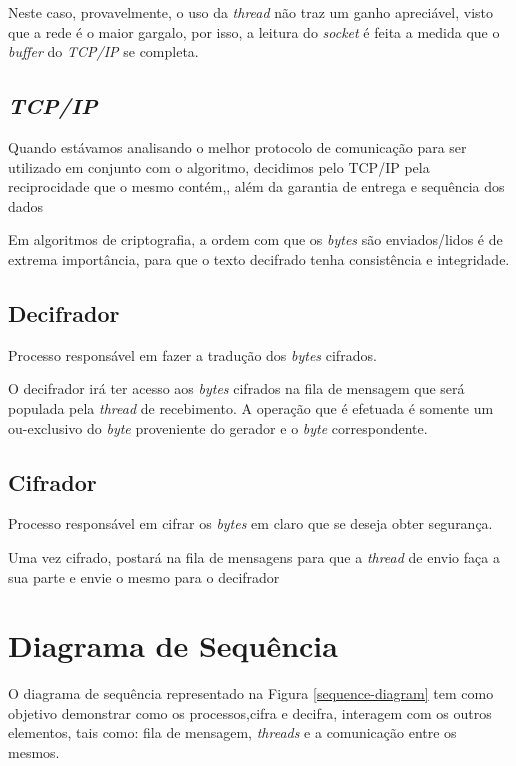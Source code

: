 Neste caso, provavelmente, o uso da \textit{thread} não traz um ganho apreciável, visto que a rede é o maior gargalo, por isso, a leitura do \textit{socket} é feita a medida que o \textit{buffer} do \textit{TCP/IP} se completa.

\subsection{\textit{TCP/IP}}

Quando estávamos analisando o melhor protocolo de comunicação para ser utilizado em conjunto com o algoritmo, decidimos pelo TCP/IP pela reciprocidade que o mesmo contém,, além da garantia de entrega e sequência dos dados 

Em algoritmos de criptografia, a ordem com que os \textit{bytes} são enviados/lidos é de extrema importância, para que o texto decifrado tenha consistência e integridade. 
\subsection{Decifrador}

Processo responsável em fazer a tradução dos \textit{bytes} cifrados. 

O decifrador irá ter acesso aos \textit{bytes} cifrados na fila de mensagem que será populada pela \textit{thread} de recebimento. A operação que é efetuada é somente um ou-exclusivo do \textit{byte} proveniente do gerador e o \textit{byte} correspondente.

\subsection{Cifrador}

Processo responsável em cifrar os \textit{bytes} em claro que se deseja obter segurança.

Uma vez cifrado, postará na fila de mensagens para que a \textit{thread} de envio faça a sua parte e envie o mesmo para o decifrador

\section{Diagrama de Sequência}

O diagrama de sequência representado na Figura \ref{sequence-diagram} tem como objetivo demonstrar como os processos,cifra e  decifra, interagem com os outros elementos, tais como: fila de mensagem, \textit{threads} e a comunicação entre os mesmos. 

